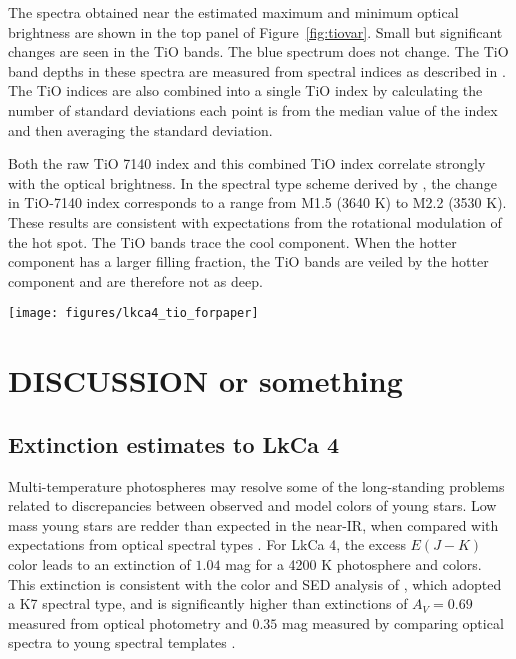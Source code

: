 \documentclass[twocolumn]{emulateapj}%
\begin{document}
The spectra obtained near the estimated maximum and minimum optical brightness are shown in the top panel of Figure~\ref{fig:tiovar}.  Small but significant changes are seen in the TiO bands.  The blue spectrum does not change.  The TiO band depths in these spectra are measured from spectral indices as described in \citet{herczeg14}.  The TiO indices are also combined into a single TiO index by calculating the number of standard deviations each point is from the median value of the index and then averaging the standard deviation.  

Both the raw TiO 7140 index and this combined TiO index correlate strongly with the optical brightness.  In the spectral type scheme derived by \citet{herczeg14}, the change in TiO-7140 index corresponds to a range from M1.5 (3640 K) to M2.2 (3530 K).  These results are consistent with expectations from the rotational modulation of the hot spot.  The TiO bands trace the cool component.  When the hotter component has a larger filling fraction, the TiO bands are veiled by the hotter component and are therefore not as deep.


\begin{figure*}
 \centering
 \texttt{[image: figures/lkca4\_tio\_forpaper]}
 \caption{Variability in TiO bands measured with ESPaDOnS.  The V-band emission is estimated from fits to the ASAS-SN lightcurve obtained during the same period.  The main panel shows a correlation between V-band magnitude and the TiO-7140 index, while the inset shows a similar correlation with the average of the TiO 6200, CaH 6800, and TiO 7600 indices.}
 \label{fig:tiovar}
\end{figure*}

\section{DISCUSSION or something}



\subsection{Extinction estimates to LkCa 4}

Multi-temperature photospheres may resolve some of the long-standing problems related to discrepancies between observed and model colors of young stars.  Low mass young stars are redder than expected in the near-IR, when compared with expectations from optical spectral types \citep[e.g.][]{tottle15}.  For LkCa 4, the excess $E(J-K)$ color leads to an extinction of $1.04$ mag for a 4200 K photosphere and \citep{pecaut13} colors.  This extinction is consistent with the color and SED analysis of \citet{furlan06}, which adopted a K7 spectral type, and is significantly higher than extinctions of $A_V=0.69$ measured from optical photometry \citep{kenyon95} and $0.35$ mag measured by comparing optical spectra to young spectral templates \citep{herczeg14}.  
\end{document}
